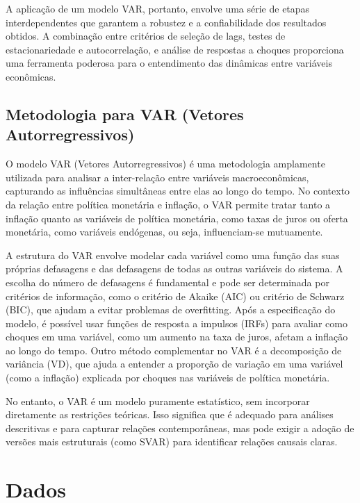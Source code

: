 \documentclass[12pt,oneside,a4paper,chapter=TITLE,english,brazil,sumario=abnt-6027-2012]{abntex2}
\begin{document}
A aplicação de um modelo VAR, portanto, envolve uma série de etapas interdependentes que garantem a robustez e a confiabilidade dos resultados obtidos. A combinação entre critérios de seleção de lags, testes de estacionariedade e autocorrelação, e análise de respostas a choques proporciona uma ferramenta poderosa para o entendimento das dinâmicas entre variáveis econômicas.

\subsection{Metodologia para VAR (Vetores Autorregressivos)}
O modelo VAR (Vetores Autorregressivos) é uma metodologia amplamente utilizada para analisar a inter-relação entre variáveis macroeconômicas, capturando as influências simultâneas entre elas ao longo do tempo. No contexto da relação entre política monetária e inflação, o VAR permite tratar tanto a inflação quanto as variáveis de política monetária, como taxas de juros ou oferta monetária, como variáveis endógenas, ou seja, influenciam-se mutuamente.

A estrutura do VAR envolve modelar cada variável como uma função das suas próprias defasagens e das defasagens de todas as outras variáveis do sistema. A escolha do número de defasagens é fundamental e pode ser determinada por critérios de informação, como o critério de Akaike (AIC) ou critério de Schwarz (BIC), que ajudam a evitar problemas de overfitting. Após a especificação do modelo, é possível usar funções de resposta a impulsos (IRFs) para avaliar como choques em uma variável, como um aumento na taxa de juros, afetam a inflação ao longo do tempo. Outro método complementar no VAR é a decomposição de variância (VD), que ajuda a entender a proporção de variação em uma variável (como a inflação) explicada por choques nas variáveis de política monetária.

No entanto, o VAR é um modelo puramente estatístico, sem incorporar diretamente as restrições teóricas. Isso significa que é adequado para análises descritivas e para capturar relações contemporâneas, mas pode exigir a adoção de versões mais estruturais (como SVAR) para identificar relações causais claras.



\section{Dados}

\end{document}
